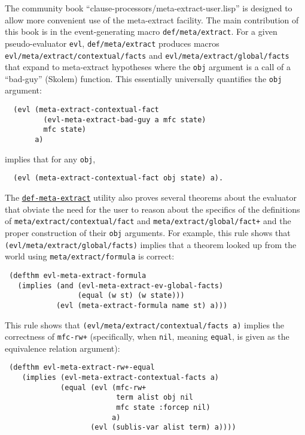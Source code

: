 The community book ``clause-processors/meta-extract-user.lisp'' is
designed to allow more convenient use of the meta-extract facility.
The main contribution of this book is in the event-generating macro
\texttt{def\-/meta\-/extract}. For a given pseudo-evaluator \texttt{evl},
\texttt{def\-/meta\-/extract} produces macros
\texttt{evl\-/meta\-/extract\-/contextual\-/facts} and
\texttt{evl\-/meta\-/extract\-/global\-/facts} that expand to meta-extract
hypotheses where the \texttt{obj} argument is a call of a ``bad-guy'' (Skolem)
function.  This essentially universally quantifies the \texttt{obj}
argument:
\begin{verbatim}
  (evl (meta-extract-contextual-fact
         (evl-meta-extract-bad-guy a mfc state)
         mfc state)
       a)
\end{verbatim}
implies that for any \texttt{obj},
\begin{verbatim}
  (evl (meta-extract-contextual-fact obj state) a).
\end{verbatim}

The
\href{http://www.cs.utexas.edu/users/moore/acl2/manuals/current/manual/index.html?topic=ACL2\_\_\_\_DEF-META-EXTRACT}{\underline{\tt def-meta-extract}}
utility also proves several theorems
about the evaluator that obviate the need for the user to reason about
the specifics of the definitions of
\texttt{meta\-/extract\-/contextual\-/fact} and
\texttt{meta\-/extract\-/global\-/fact+} and the proper construction of
their \texttt{obj} arguments.  For example, this rule shows that
\texttt{(evl\-/meta\-/extract\-/global\-/facts)} implies that a theorem looked
up from the world using \texttt{meta\-/extract\-/formula} is correct:
\begin{verbatim}
 (defthm evl-meta-extract-formula
   (implies (and (evl-meta-extract-ev-global-facts)
                 (equal (w st) (w state)))
            (evl (meta-extract-formula name st) a)))

\end{verbatim}
This rule shows that
\texttt{(evl\-/meta\-/extract\-/contextual\-/facts a)} implies the correctness
of \texttt{mfc-rw+} (specifically, when \texttt{nil}, meaning
\texttt{equal}, is given as the equivalence relation argument):
\begin{verbatim}
 (defthm evl-meta-extract-rw+-equal
    (implies (evl-meta-extract-contextual-facts a)
             (equal (evl (mfc-rw+
                          term alist obj nil
                          mfc state :forcep nil)
                         a)
                    (evl (sublis-var alist term) a))))
\end{verbatim}

